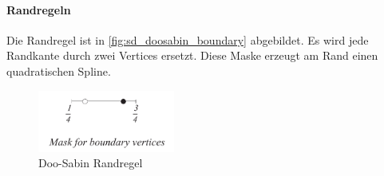 \paragraph*{Randregeln}

Die Randregel ist in \autoref{fig:sd_doosabin_boundary} abgebildet.
Es wird jede Randkante durch zwei Vertices ersetzt.
Diese Maske erzeugt am Rand einen quadratischen Spline.
\cite[S. 79f]{Zorin.subdivcourse}

\begin{figure}
\centering
\includegraphics[width=0.4\textwidth]{content/media/sd_doosabin_boundary.jpg}
\caption{Doo-Sabin Randregel \cite[S. 80]{Zorin.subdivcourse}}
\label{fig:sd_doosabin_boundary}
\end{figure}
